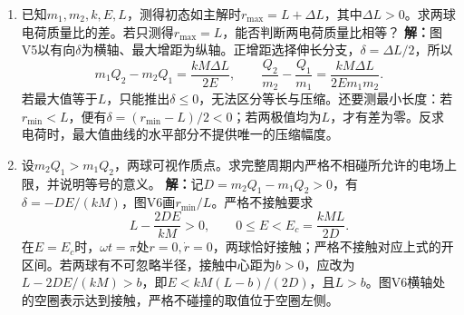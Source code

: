 \documentclass[UTF8,fontset=fandol,a4paper,11pt]{ctexart}
\newcommand{\figcaption}[1]{\par\vspace{2pt}{\small\color{muted}#1}\par}
\begin{document}
\begin{enumerate}
\item 已知$m_1,m_2,k,E,L$，测得初态如主解时$r_{\max}=L+\Delta L$，其中$\Delta L>0$。求两球电荷质量比的差。若只测得$r_{\max}=L$，能否判断两电荷质量比相等？
\textbf{解：}图V5以有向$\delta$为横轴、最大增距为纵轴。正增距选择伸长分支，$\delta=\Delta L/2$，所以
\[m_1Q_2-m_2Q_1=\frac{kM\Delta L}{2E},\qquad
\frac{Q_2}{m_2}-\frac{Q_1}{m_1}=\frac{kM\Delta L}{2E m_1m_2}.\]
若最大值等于$L$，只能推出$\delta\le0$，无法区分等长与压缩。还要测最小长度：若$r_{\min}<L$，便有$\delta=(r_{\min}-L)/2<0$；若两极值均为$L$，才有差为零。反求电荷时，最大值曲线的水平部分不提供唯一的压缩幅度。
\begin{center}\begin{minipage}{.98\linewidth}\centering
{}
\figcaption{变图电试1.1V5}
\end{minipage}\end{center}

\item 设$m_2Q_1>m_1Q_2$，两球可视作质点。求完整周期内严格不相碰所允许的电场上限，并说明等号的意义。
\textbf{解：}记$D=m_2Q_1-m_1Q_2>0$，有$\delta=-DE/(kM)$，图V6画$r_{\min}/L$。严格不接触要求
\[L-\frac{2DE}{kM}>0,\qquad 0\le E<E_c=\frac{kML}{2D}.\]
在$E=E_c$时，$\omega t=\pi$处$r=0,\dot r=0$，两球恰好接触；严格不接触对应上式的开区间。若两球有不可忽略半径，接触中心距为$b>0$，应改为$L-2DE/(kM)>b$，即$E<kM(L-b)/(2D)$，且$L>b$。图V6横轴处的空圈表示达到接触，严格不碰撞的取值位于空圈左侧。
\begin{center}\begin{minipage}{.98\linewidth}\centering
{}
\figcaption{变图电试1.1V6}
\end{minipage}\end{center}


\end{enumerate}
\end{document}
